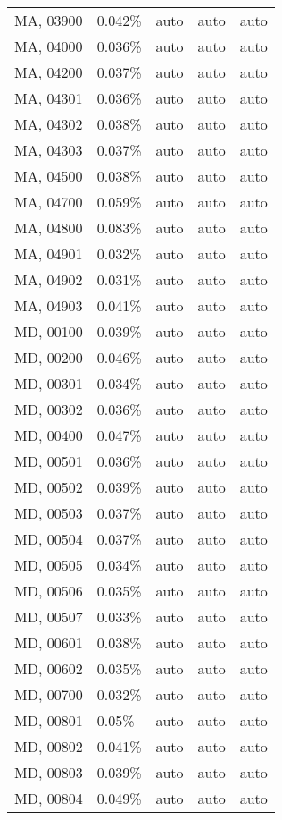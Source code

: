 \begin{longtable}[]{@{}lllll@{}}
MA, 03900 & 0.042\% & auto & auto & auto \\
MA, 04000 & 0.036\% & auto & auto & auto \\
MA, 04200 & 0.037\% & auto & auto & auto \\
MA, 04301 & 0.036\% & auto & auto & auto \\
MA, 04302 & 0.038\% & auto & auto & auto \\
MA, 04303 & 0.037\% & auto & auto & auto \\
MA, 04500 & 0.038\% & auto & auto & auto \\
MA, 04700 & 0.059\% & auto & auto & auto \\
MA, 04800 & 0.083\% & auto & auto & auto \\
MA, 04901 & 0.032\% & auto & auto & auto \\
MA, 04902 & 0.031\% & auto & auto & auto \\
MA, 04903 & 0.041\% & auto & auto & auto \\
MD, 00100 & 0.039\% & auto & auto & auto \\
MD, 00200 & 0.046\% & auto & auto & auto \\
MD, 00301 & 0.034\% & auto & auto & auto \\
MD, 00302 & 0.036\% & auto & auto & auto \\
MD, 00400 & 0.047\% & auto & auto & auto \\
MD, 00501 & 0.036\% & auto & auto & auto \\
MD, 00502 & 0.039\% & auto & auto & auto \\
MD, 00503 & 0.037\% & auto & auto & auto \\
MD, 00504 & 0.037\% & auto & auto & auto \\
MD, 00505 & 0.034\% & auto & auto & auto \\
MD, 00506 & 0.035\% & auto & auto & auto \\
MD, 00507 & 0.033\% & auto & auto & auto \\
MD, 00601 & 0.038\% & auto & auto & auto \\
MD, 00602 & 0.035\% & auto & auto & auto \\
MD, 00700 & 0.032\% & auto & auto & auto \\
MD, 00801 & 0.05\% & auto & auto & auto \\
MD, 00802 & 0.041\% & auto & auto & auto \\
MD, 00803 & 0.039\% & auto & auto & auto \\
MD, 00804 & 0.049\% & auto & auto & auto \\

\end{longtable}
